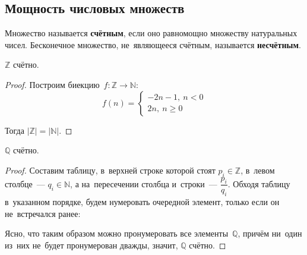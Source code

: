 \subsection{Мощность числовых множеств}
Множество называется \textbf{счётным}, если оно равномощно множеству натуральных чисел.
Бесконечное множество, не~являющееся счётным, называется \textbf{несчётным}.

\begin{statement}
$\mathbb Z$ счётно.
\end{statement}
\begin{proof}
Построим биекцию~$f \colon \mathbb Z \to \mathbb N$:
\begin{equation*}
f(n) =
\begin{cases}
-2n - 1, \ n < 0 \\
2n, \ n \geqslant 0
\end{cases}
\end{equation*}

Тогда $|\mathbb Z| = |\mathbb N|$.
\end{proof}

\begin{statement}
$\mathbb Q$ счётно.
\end{statement}
\begin{proof}
Составим таблицу, в~верхней строке которой стоят $p_i \in \mathbb Z$, в~левом столбце~--- $q_i \in \mathbb N$, а на~пересечении столбца и~строки~--- $\dfrac{p_i}{q_i}$.
Обходя таблицу в~указанном порядке, будем нумеровать очередной элемент, только если он не~встречался ранее:


Ясно, что таким образом можно пронумеровать все элементы~$\mathbb Q$, причём ни~один из~них не~будет пронумерован дважды, значит, $\mathbb Q$ счётно.
\end{proof}

